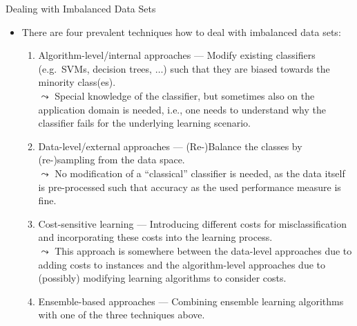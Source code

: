 \begin{vbframe}{Dealing with Imbalanced Data Sets}
%
\footnotesize
  \begin{itemize}
  	\footnotesize
%    
    \item  There are four prevalent techniques how to deal with imbalanced data sets:
%	
	\begin{enumerate}
		\footnotesize
%		
		\item  Algorithm-level/internal approaches --- Modify existing classifiers (e.g.\ SVMs, decision trees, $\ldots$) such that they are biased towards the minority class(es). \\
%		
		$\leadsto$ Special knowledge of the classifier, but sometimes also on the application domain is needed, i.e., one needs to understand why the classifier fails for the underlying learning scenario.
%		
		\item Data-level/external approaches --- (Re-)Balance the classes by (re-)sampling from the data space.\\
%		
		$\leadsto$ No modification of a ``classical'' classifier is needed, as the data itself is pre-processed such that accuracy as the used performance measure is fine.
%		
		\item Cost-sensitive learning --- Introducing different costs for misclassification and incorporating these costs into the learning process. \\
%		
		$\leadsto$  This approach is somewhere between the data-level approaches due to adding costs to instances and the algorithm-level approaches due to (possibly) modifying learning algorithms to consider costs.
%		
		\item Ensemble-based approaches --- Combining ensemble learning algorithms with one of the three techniques above.
%
	\end{enumerate}
%
  \end{itemize}
%
\end{vbframe}


%
\endlecture


